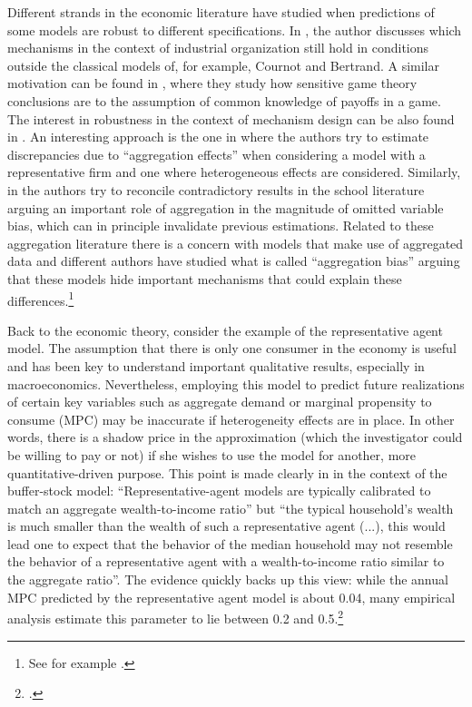 \documentclass[english, a4paper,12pt]{article}
\begin{document}
Different strands in the economic literature have studied when predictions of some models are robust to different specifications. In \cite{SuttonMarketStruct}, the author discusses which mechanisms in the context of industrial organization still hold in conditions outside the classical models of, for example, Cournot and Bertrand. A similar motivation can be found in \cite{Morris97}, where they study how sensitive game theory conclusions are to the assumption of common knowledge of payoffs in a game. The interest in robustness in the context of mechanism design can be also found in \cite{Morris2011}. An interesting approach is the one in \cite{Basu97} where the authors try to estimate discrepancies due to ``aggregation effects'' when considering a model with a representative firm and one where heterogeneous effects are considered. Similarly, in \cite{SchoolAggregation} the authors try to reconcile contradictory results in the school literature arguing an important role of aggregation in the magnitude of omitted variable bias, which can in principle invalidate previous estimations. Related to these aggregation literature there is a concern with models that make use of aggregated data and different authors have studied what is called ``aggregation bias'' arguing that these models hide important mechanisms that could explain these differences.\footnote{See for example \cite{Agg1, Agg2, Agg3, Agg4}.}  

Back to the economic theory, consider the example of the representative agent model. The assumption that there is only one consumer in the economy is useful and has been key to understand important qualitative results, especially in macroeconomics. Nevertheless, employing this model to predict future realizations of certain key variables such as aggregate demand or marginal propensity to consume (MPC) may be inaccurate if heterogeneity effects are in place. In other words, there is a shadow price in the approximation (which the investigator could be willing to pay or not) if she wishes to use the model for another, more quantitative-driven purpose. This point is made clearly in \cite{CarrollRequiem} in the context of the buffer-stock model: ``Representative-agent models are typically calibrated to match an aggregate wealth-to-income ratio'' but ``the typical household’s wealth is much smaller than the wealth of such a representative agent (...), this would lead one to expect that the behavior of the median household may not resemble the behavior of a representative agent with a wealth-to-income ratio similar to the aggregate ratio''. The evidence quickly backs up this view: while the annual MPC predicted by the representative agent model is about 0.04, many empirical analysis estimate this parameter to lie between 0.2 and 0.5.\footnote{\cite{CarrollRequiem}.} 
\end{document}

